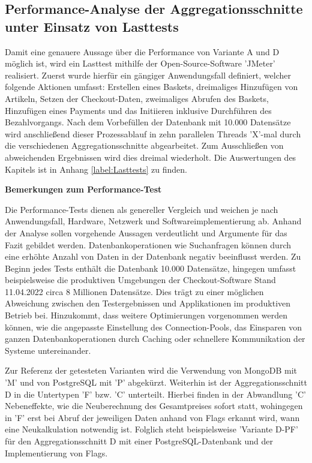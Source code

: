 \subsection{Performance-Analyse der Aggregationsschnitte unter Einsatz von Lasttests}

Damit eine genauere Aussage über die Performance von Variante A und D möglich ist, wird ein Lasttest mithilfe der Open-Source-Software 'JMeter' realisiert. Zuerst wurde hierfür ein gängiger Anwendungsfall definiert, welcher folgende Aktionen umfasst: Erstellen eines Baskets, dreimaliges Hinzufügen von Artikeln, Setzen der Checkout-Daten, zweimaliges Abrufen des Baskets, Hinzufügen eines Payments und das Initiieren inklusive Durchführen des Bezahlvorgangs. Nach dem Vorbefüllen der Datenbank mit 10.000 Datensätze wird anschließend dieser Prozessablauf in zehn parallelen Threads 'X'-mal durch die verschiedenen Aggregationsschnitte abgearbeitet. Zum Ausschließen von abweichenden Ergebnissen wird dies dreimal wiederholt. Die Auswertungen des Kapitels ist in Anhang \ref{label:Lasttests} zu finden.

\textbf{Bemerkungen zum Performance-Test}

Die Performance-Tests dienen als genereller Vergleich und weichen je nach Anwendungsfall, Hardware, Netzwerk und Softwareimplementierung ab. Anhand der Analyse sollen vorgehende Aussagen verdeutlicht und Argumente für das Fazit gebildet werden. Datenbankoperationen wie Suchanfragen können durch eine erhöhte Anzahl von Daten in der Datenbank negativ beeinflusst werden. Zu Beginn jedes Tests enthält die Datenbank 10.000 Datensätze, hingegen umfasst beispielsweise die produktiven Umgebungen der Checkout-Software Stand 11.04.2022 circa 8 Millionen Datensätze. Dies trägt zu einer möglichen Abweichung zwischen den Testergebnissen und Applikationen im produktiven Betrieb bei. Hinzukommt, dass weitere Optimierungen vorgenommen werden können, wie die angepasste Einstellung des \Gls{Connection-Pool}s, das Einsparen von ganzen Datenbankoperationen durch Caching oder schnellere Kommunikation der Systeme untereinander. 

Zur Referenz der getesteten Varianten wird die Verwendung von MongoDB mit 'M' und von PostgreSQL mit 'P' abgekürzt. Weiterhin ist der Aggregationsschnitt D in die Untertypen 'F' bzw. 'C' unterteilt. Hierbei finden in der Abwandlung 'C' Nebeneffekte, wie die Neuberechnung des Gesamtpreises sofort statt, wohingegen in 'F' erst bei Abruf der jeweiligen Daten anhand von Flags erkannt wird, wann eine Neukalkulation notwendig ist. Folglich steht beispielsweise 'Variante D-PF' für den Aggregationsschnitt D mit einer PostgreSQL-Datenbank und der Implementierung von Flags.

